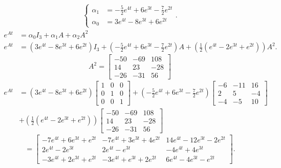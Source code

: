 \documentclass{zc-ust-hw}
\begin{document}
\begin{enumerate}
\begin{sol}
\begin{align}
\begin{cases}
          \alpha_{1} &= -\frac{5}{2}e^{4t} + 6e^{3t} - \frac{7}{2}e^{2t} \\
          \alpha_{0} &= 3e^{4t}-8e^{3t}+6e^{2t}   
        \end{cases}
      .\end{align}
      \begin{align}
        e^{At} &= \alpha_{0} I_{3} + \alpha_{1} A + \alpha_{2} A^2 \\
        e^{At} &= (3e^{4t}-8e^{3t}+6e^{2t}) I_{3} + (-\frac{5}{2}e^{4t} + 6e^{3t} - \frac{7}{2}e^{2t}) A + (\frac{1}{2}(e^{4t}-2e^{3t}+e^{2t})) A^2
      .\end{align}
      \begin{equation}
        A^2 = \begin{bmatrix} 
          -50&-69&108\\
          14&23&-28\\
          -26&-31&56
        \end{bmatrix} 
      \end{equation}
      \begin{equation}
        \begin{split}
          e^{At} &= (3e^{4t}-8e^{3t}+6e^{2t}) \begin{bmatrix}
            1&0&0\\0&1&0\\0&0&1 \end{bmatrix} + (-\frac{5}{2}e^{4t} + 6e^{3t} -
            \frac{7}{2}e^{2t}) \begin{bmatrix} -6&-11&16\\2&5&-4\\-4&-5&10
              \end{bmatrix} \\ &+ (\frac{1}{2}(e^{4t}-2e^{3t}+e^{2t}))
              \begin{bmatrix} -50&-69&108\\ 14&23&-28\\ -26&-31&56
              \end{bmatrix}
        \end{split}
      \end{equation}
      \begin{equation}
        = \begin{bmatrix} 
          -7e^{4t}+6e^{3t}+e^{2t}&-7e^{4t}+3e^{3t}+4e^{2t}&14e^{4t}-12e^{3t}-2e^{2t}\\
          2e^{4t}-2e^{3t}&2e^{4t}-e^{3t}&-4e^{4t}+4e^{3t}\\
          -3e^{4t}+2e^{3t}+e^{2t}&-3e^{4t}+e^{3t}+2e^{2t}&6e^{4t}-4e^{3t}-e^{2t}
        \end{bmatrix} 
      .\end{equation}
    \end{sol}


\end{enumerate}
\end{document}
